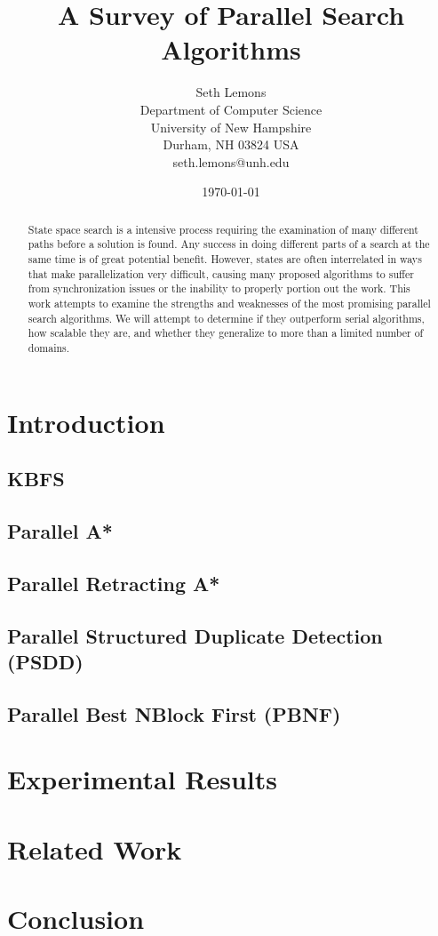 \documentclass{article}
\title{A Survey of Parallel Search Algorithms}
\author{Seth Lemons \\
Department of Computer Science \\
University of New Hampshire \\
Durham, NH 03824 USA \\
seth.lemons@unh.edu}
\date{\today}
\begin{document}
\maketitle

\begin{abstract}
State space search is a intensive process requiring the examination of many different paths before a solution is found. Any success in doing different parts of a search at the same time is of great potential benefit. However, states are often interrelated in ways that make parallelization very difficult, causing many proposed algorithms to suffer from synchronization issues or the inability to properly portion out the work. This work attempts to examine the strengths and weaknesses of the most promising parallel search algorithms. We will attempt to determine if they outperform serial algorithms, how scalable they are, and whether they generalize to more than a limited number of domains.
\end{abstract}

\section{Introduction}
\subsection{KBFS}
\subsection{Parallel A*}
\subsection{Parallel Retracting A*}
\subsection{Parallel Structured Duplicate Detection (PSDD)}
\subsection{Parallel Best NBlock First (PBNF)}
\section{Experimental Results}
\section{Related Work}
\section{Conclusion}



\end{document}
